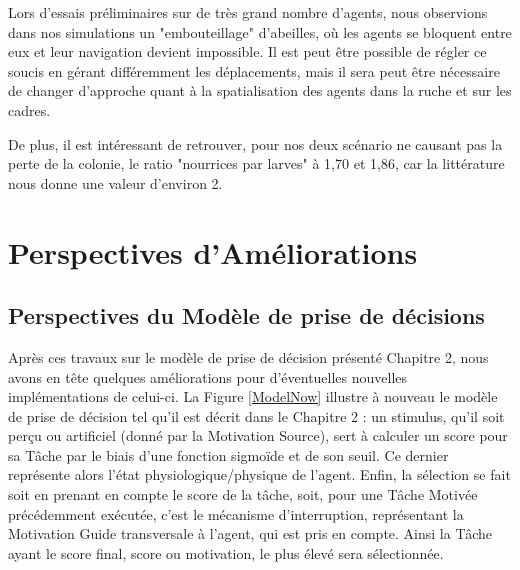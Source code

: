 		 Lors d'essais préliminaires sur de très grand nombre d'agents, nous observions dans nos simulations un "embouteillage" d'abeilles, où les agents se bloquent entre eux et leur navigation devient impossible. Il est peut être possible de régler ce soucis en gérant différemment les déplacements, mais il sera peut être nécessaire de changer d'approche quant à la spatialisation des agents dans la ruche et sur les cadres.
		 
		 De plus, il est intéressant de retrouver, pour nos deux scénario ne causant pas la perte de la colonie, le ratio "nourrices par larves" à 1,70 et 1,86, car la littérature nous donne une valeur d'environ 2.
	
	
	\section{Perspectives d'Améliorations}
	\label{sectionPerspectivesSMA}
	
	\subsection{Perspectives du Modèle de prise de décisions}
	Après ces travaux sur le modèle de prise de décision présenté Chapitre 2, nous avons en tête quelques améliorations pour d'éventuelles nouvelles implémentations de celui-ci. La Figure \ref{ModelNow} illustre à nouveau le modèle de prise de décision tel qu'il est décrit dans le Chapitre 2 : un stimulus, qu'il soit perçu ou artificiel (donné par la Motivation Source), sert à calculer un score pour sa Tâche par le biais d'une fonction sigmoïde et de son seuil. Ce dernier représente alors l'état physiologique/physique de l'agent. Enfin, la sélection se fait soit en prenant en compte le score de la tâche, soit, pour une Tâche Motivée précédemment exécutée, c'est le mécanisme d'interruption, représentant la Motivation Guide transversale à l'agent, qui est pris en compte. Ainsi la Tâche ayant le score final, score ou motivation, le plus élevé sera sélectionnée.
	
